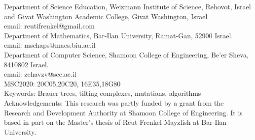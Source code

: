 \documentclass[11pt,english]{article}
\numberwithin{figure}{section}
\numberwithin{equation}{section}
\numberwithin{table}{section}
\theoremstyle{definition}
\theoremstyle{remark}
\begin{document}
{Department of Science Education, Weizmann Institute of Science,  Rehovot, Israel and Givat Washington Academic College, Givat Washington, Israel}\\
email: reutifrenkel@gmail.com\\
{Department of Mathematics, Bar-Ilan University, Ramat-Gan,  52900 Israel}.
email: {mschaps@macs.biu.ac.il}\\
{Department of Computer Science, Shamoon College of Engineering,  Be'er Sheva, 8410802 Israel}.\\
 email: zehavzv@sce.ac.il\\
MSC2020: {20C05,20C20, 16E35,18G80}\\
Keywords: {Brauer trees,  tilting complexes, mutations, algorithms}\\
Acknowledgements: This research was partly funded by a grant from the Research and Development Authority at Shamoon College of Engineering. It is based in part on the Master's thesis of Reut Frenkel-Mayzlish at Bar-Ilan University.
\end{document}
